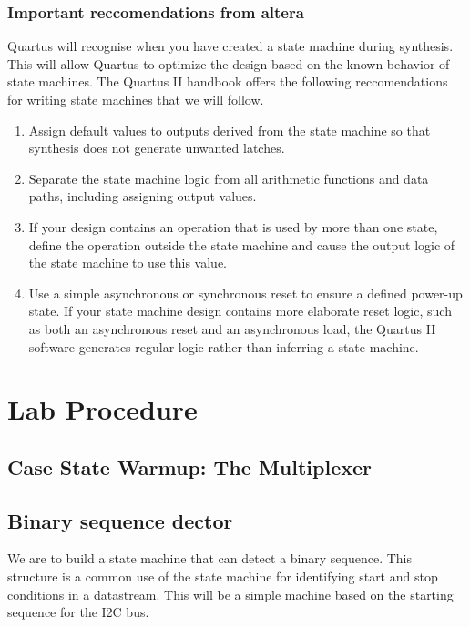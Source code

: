     \subsubsection{Important reccomendations from altera}
      Quartus will recognise when you have created a state machine during synthesis. This will allow Quartus to optimize the design based on the known behavior of state machines. The Quartus II handbook offers the following reccomendations for writing state machines that we will follow.
      \begin{enumerate}
        \item Assign default values to outputs derived from the state machine so that synthesis does not generate unwanted latches.
        \item Separate the state machine logic from all arithmetic functions and data paths, including assigning output values.
        \item If your design contains an operation that is used by more than one state, define the operation outside the state machine and cause the output logic of the state machine to use this value.
        \item Use a simple asynchronous or synchronous reset to ensure a defined power-up state. If your state machine design contains more elaborate reset logic, such as both an asynchronous reset and an asynchronous load, the Quartus II software generates regular logic rather than inferring a state machine.
      \end{enumerate}

      \clearpage
      
\section{ Lab Procedure}
  \subsection{Case State Warmup: The Multiplexer}

  \subsection{Binary sequence dector}
  We are to build a state machine that can detect a binary sequence. This structure is a common use of the state machine for identifying start and stop conditions in a datastream. This will be a simple machine based on the starting sequence for the I2C bus.

